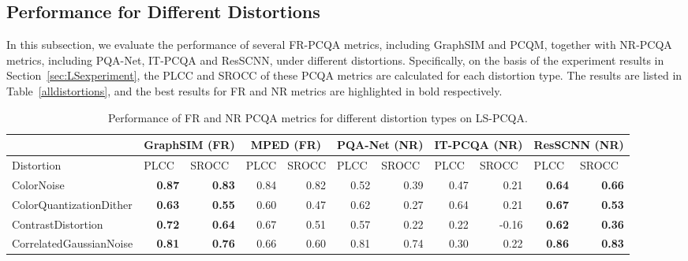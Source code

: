 \documentclass[acmsmall]{acmart}
\begin{document}
\subsection{Performance for Different Distortions}


\par In this subsection, we evaluate the performance of several FR-PCQA metrics, including GraphSIM and PCQM, together with NR-PCQA metrics, including PQA-Net, IT-PCQA and ResSCNN, under different distortions. Specifically, on the basis of the experiment results in Section~\ref{sec:LSexperiment}, the PLCC and SROCC of these PCQA metrics are calculated for each distortion type. The results are listed in Table~\ref{alldistortions}, and the best results for FR and NR metrics are highlighted in bold respectively.


\begin{table}[htbp]
  \centering
  \caption{Performance of FR and NR PCQA metrics for different distortion types on LS-PCQA.}
  \begin{tiny}
    \begin{tabular}{p{13.5em}|rr|rr|rr|rr|rr}
    \hline
    \multicolumn{1}{r|}{} & \multicolumn{2}{c|}{GraphSIM (FR)} & \multicolumn{2}{c|}{MPED (FR)} & \multicolumn{2}{c|}{PQA-Net (NR)} & \multicolumn{2}{c|}{IT-PCQA (NR)} & \multicolumn{2}{c}{ResSCNN (NR)} \\
    \hline
    \multicolumn{1}{l|}{Distortion} & \multicolumn{1}{l}{PLCC} & \multicolumn{1}{l|}{SROCC} & \multicolumn{1}{l}{PLCC} & \multicolumn{1}{l|}{SROCC} & \multicolumn{1}{l}{PLCC} & \multicolumn{1}{l|}{SROCC} & \multicolumn{1}{l}{PLCC} & \multicolumn{1}{l|}{SROCC} & \multicolumn{1}{l}{PLCC} & \multicolumn{1}{l}{SROCC} \\
    \hline
    \multicolumn{1}{l|}{ColorNoise} & \textbf{0.87}  & \textbf{0.83}  & 0.84  & 0.82  & 0.52  & 0.39  & 0.47  & 0.21  & \textbf{0.64}  & \textbf{0.66}  \\
    \multicolumn{1}{l|}{ColorQuantizationDither} & \textbf{0.63}  & \textbf{0.55}  & 0.60  & 0.47  & 0.62  & 0.27  & 0.64  & 0.21  & \textbf{0.67}  & \textbf{0.53}  \\
    \multicolumn{1}{l|}{ContrastDistortion} & \textbf{0.72}  & \textbf{0.64}  & 0.67  & 0.51  & 0.57  & 0.22  & 0.22  & -0.16  & \textbf{0.62}  & \textbf{0.36}  \\
    \multicolumn{1}{l|}{CorrelatedGaussianNoise} & \textbf{0.81}  & \textbf{0.76}  & 0.66  & 0.60  & 0.81  & 0.74  & 0.30  & 0.22  & \textbf{0.86}  & \textbf{0.83}  \\

\end{tabular}
\end{tiny}
\end{table}
\end{document}
